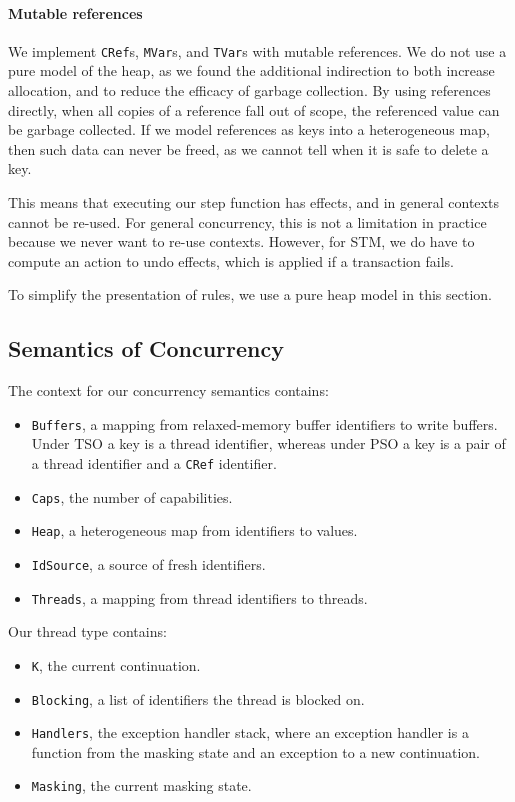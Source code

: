 \paragraph{Mutable references}
We implement \verb|CRef|s, \verb|MVar|s, and \verb|TVar|s with mutable
references.  We do not use a pure model of the heap, as we found the
additional indirection to both increase allocation, and to reduce the
efficacy of garbage collection.  By using references directly, when
all copies of a reference fall out of scope, the referenced value can
be garbage collected.  If we model references as keys into a
heterogeneous map, then such data can never be freed, as we cannot
tell when it is safe to delete a key.

This means that executing our step function has effects, and in
general contexts cannot be re-used.  For general concurrency, this is
not a limitation in practice because we never want to re-use contexts.
However, for STM, we do have to compute an action to undo effects,
which is applied if a transaction fails.

To simplify the presentation of rules, we use a pure heap model in
this section.

\subsection{Semantics of Concurrency}

The context for our concurrency semantics contains:

\begin{itemize}
\item \verb|Buffers|, a mapping from relaxed-memory buffer identifiers
  to write buffers.  Under TSO a key is a thread identifier, whereas
  under PSO a key is a pair of a thread identifier and a \verb|CRef|
  identifier.
\item \verb|Caps|, the number of capabilities.
\item \verb|Heap|, a heterogeneous map from identifiers to values.
\item \verb|IdSource|, a source of fresh identifiers.
\item \verb|Threads|, a mapping from thread identifiers to threads.
\end{itemize}

Our thread type contains:

\begin{itemize}
\item \verb|K|, the current continuation.
\item \verb|Blocking|, a list of identifiers the thread is blocked on.
\item \verb|Handlers|, the exception handler stack, where an exception
  handler is a function from the masking state and an exception to a
  new continuation.
\item \verb|Masking|, the current masking state.
\end{itemize}

